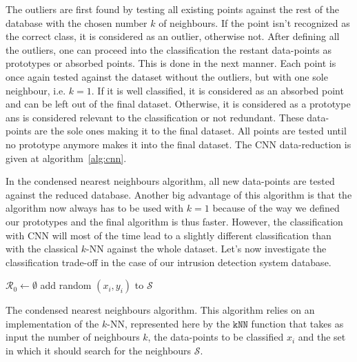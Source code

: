 The outliers are first found by testing all existing points against the rest of the database with the chosen number $k$ of neighbours. If the point isn't recognized as the correct class, it is considered as an outlier, otherwise not. After defining all the outliers, one can proceed into the classification the restant data-points as prototypes or absorbed points. This is done in the next manner. Each point is once again tested against the dataset without the outliers, but with one sole neighbour, i.e. $k=1$. If it is well classified, it is considered as an absorbed point and can be left out of the final dataset. Otherwise, it is considered as a prototype ans is considered relevant to the classification or not redundant. These data-points are the sole ones making it to the final dataset. All points are tested until no prototype anymore makes it into the final dataset. The CNN data-reduction is given at algorithm~\ref{alg:cnn}.

In the condensed nearest neighbours algorithm, all new data-points are tested against the reduced database. Another big advantage of this algorithm is that the algorithm now always has to be used with $k=1$ because of the way we defined our prototypes and the final algorithm is thus faster. However, the classification with CNN will most of the time lead to a slightly different classification than with the classical $k$-NN against the whole dataset. Let's now investigate the classification trade-off in the case of our intrusion detection system database. 

\begin{center}
\begin{algorithm}[H]
\DontPrintSemicolon
{}

$\mathcal{R}_0 \leftarrow \emptyset$ \;
add random $\left(x_i, y_i\right)$ to $\mathcal{S}$ \;

\caption{The condensed nearest neighbours algorithm. This algorithm relies on an implementation of the $k$-NN, represented here by the $\mathtt{kNN}$ function that takes as input the number of neighbours $k$, the data-points to be classified $x_i$ and the set in which it should search for the neighbours $\mathcal{S}$.}
\label{alg:cnn}
\end{algorithm}
\end{center}

\FloatBarrier